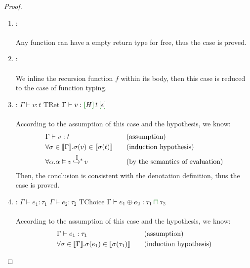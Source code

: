 \begin{proof}
\begin{enumerate}[label=Case]
{\begin{alignat}{2}
  &\sigma'(\zzlam{x}{e}\;v) \in \denot{\sigma(\tau)} \ptag{by \ref{found:1-4} and \ref{found:1-5} and Lemma~\ref{lemma:pure-denot}} \label{found:1-6}
  \end{alignat}}\noindent
Then, the conclusion is consistent with the denotation definition, thus the case is proved.
\item:
{\footnotesize
{}
\ \\ \ \\}
Any function can have a empty return type for free, thus the case is proved.
\item:
{\footnotesize
{}
\ \\ \ \\}
We inline the recursion function $f$ within its body, then this case is reduced to the case of function typing.
\item:
{\footnotesize
\mprooftr{20mm}
{$\Gamma\vdash v : t$}
{TRet}
{$\Gamma\vdash v : \uhat{H}{t}{\epsilon}$}
\ \\ \ \\}
According to the assumption of this case and the hypothesis, we know:
{\footnotesize\begin{alignat}{2}
  \setcounter{equation}{0}
  &\Gamma\vdash v : t \ptag{assumption} \label{found:2-1} \\
  &\forall \sigma \in \denot{\Gamma}. \sigma(v) \in \denot{\sigma(t)} \ptag{induction hypothesis} \label{found:2-2} \\
  &\forall \alpha.\msteptr{\alpha}{v}{[]}{v} \ptag{by the semantics of evaluation} \label{found:2-3}
  \end{alignat}}\noindent
Then, the conclusion is consistent with the denotation definition, thus the case is proved.
\item:
{\footnotesize
\mprooftr{35mm}
{
$\Gamma\vdash e_1 : \tau_1$ \quad $\Gamma\vdash e_2 : \tau_2$}
{TChoice}
{$\Gamma\vdash e_1 \oplus e_2 : \tau_1 \interty \tau_2$}
\ \\ \ \\}
According to the assumption of this case and the hypothesis, we know:
{\footnotesize\begin{alignat}{2}
  \setcounter{equation}{0}
  &\Gamma\vdash e_1 : \tau_1 \ptag{assumption} \label{found:3-1} \\
  &\forall \sigma \in \denot{\Gamma}. \sigma(e_1) \in \denot{\sigma(\tau_1)} \ptag{induction hypothesis} \label{found:3-2} \\

\end{alignat}}
\end{enumerate}
\end{proof}
